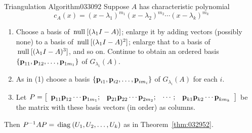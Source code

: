 \begin{theorem*}{Triangulation Algorithm}{033092}
Suppose $A$ has characteristic polynomial
\begin{equation*}
c_{A}(x) = (x - \lambda_1)^{m_1}(x - \lambda_2)^{m_2} \cdots (x - \lambda_k)^{m_k}
\end{equation*}
\begin{enumerate}
\item Choose a basis of $\thinspace\operatorname{null\medspace}[(\lambda_{1}I - A)]$; enlarge it by adding vectors (possibly none) to a basis of $\thinspace\operatorname{null\medspace}[(\lambda_{1}I - A)^{2}]$; enlarge that to a basis of $\thinspace\operatorname{null\medspace}[(\lambda_{1}I - A)^{3}]$, and so on. Continue to obtain an ordered basis $\{\textbf{p}_{11}, \textbf{p}_{12}, \dots, \textbf{p}_{1m_1}\}$ of $G_{\lambda_1}(A)$.

\item As in {\normalfont (1)} choose a basis $\{\textbf{p}_{i1}, \textbf{p}_{i2}, \dots, \textbf{p}_{im_i}\}$ of $G_{\lambda_i}(A)$ for each $i$.

\item Let $P = \left[ \begin{array}{cccc}\textbf{p}_{11} \textbf{p}_{12} \cdots \textbf{p}_{1m_1}; & \textbf{p}_{21} \textbf{p}_{22} \cdots \textbf{p}_{2m_2}; & \cdots; & \textbf{p}_{k1} \textbf{p}_{k2} \cdots \textbf{p}_{km_k}
\end{array} \right]$ be the matrix with these basis vectors (in order) as columns.
\end{enumerate}

Then $P^{-1}AP = \thinspace\operatorname{diag\medspace}(U_{1}, U_{2}, \dots, U_{k})$ as in Theorem~\ref{thm:032952}.
\end{theorem*}

